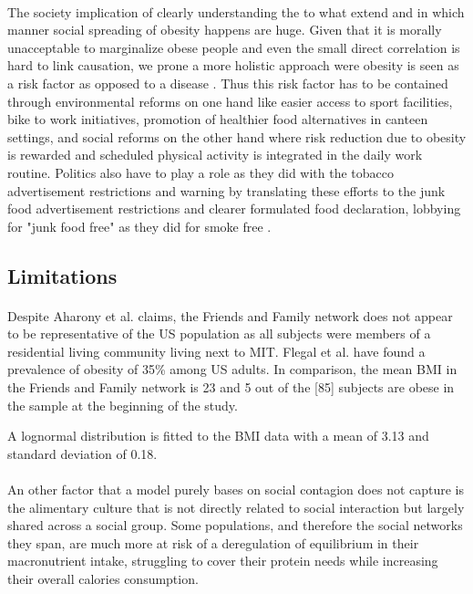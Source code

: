 \documentclass[11pt]{article}
\begin{document}
\paragraph{}
The society implication of clearly understanding the to what extend and in which manner social spreading of obesity happens are huge. Given that it is morally unacceptable to marginalize obese people and even the small direct correlation is hard to link causation, we prone a more holistic approach were obesity is seen as a risk factor as opposed to a disease . Thus this risk factor has to be contained through environmental reforms on one hand like easier access to sport facilities, bike to work initiatives, promotion of healthier food alternatives in canteen settings, and social reforms on the other hand where risk reduction due to obesity is rewarded and scheduled physical activity is integrated in the daily work routine. Politics also have to play a role as they did with the tobacco advertisement restrictions and warning by translating these efforts to the junk food advertisement restrictions and clearer formulated food declaration, lobbying for "junk food free" as they did for smoke free .

\subsection{Limitations}
\paragraph{}
Despite Aharony et al. claims, the Friends and Family network does not appear to be representative of the US population as all subjects were members of a residential living community living next to MIT. Flegal et al. have found a prevalence of obesity of 35\% among US adults. In comparison, the mean BMI in the Friends and Family network is 23 and 5 out of the [85] subjects are obese in the sample at the beginning of the study.
 

A lognormal distribution is fitted to the BMI data with a mean of 3.13 and standard deviation of 0.18.

\paragraph{}

An other factor that a model purely bases on social contagion does not capture is the alimentary culture that is not directly related to social interaction but largely shared across a social group. Some populations, and therefore the social networks they span, are much more at risk of a deregulation of equilibrium in their macronutrient intake, struggling to cover their protein needs while increasing their overall calories consumption. 
\end{document}
